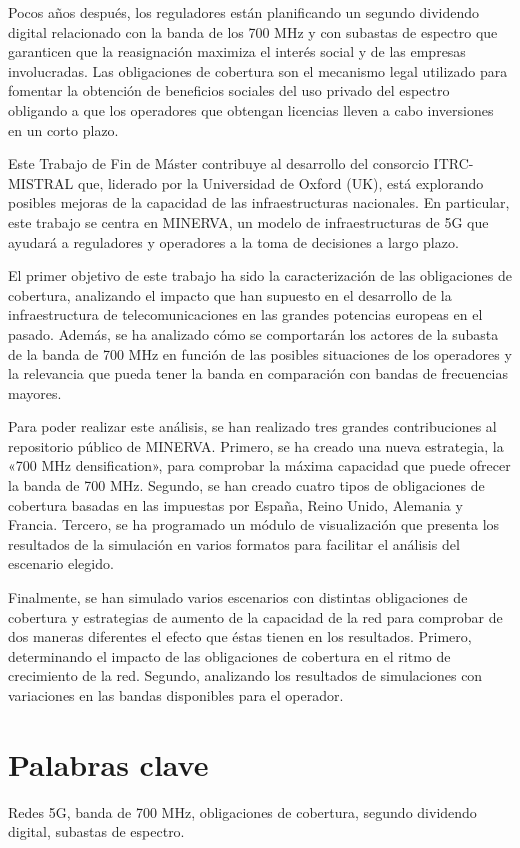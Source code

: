 Pocos años después, los reguladores están planificando un segundo dividendo digital relacionado con la banda de los 700 MHz y con subastas de espectro que garanticen que la reasignación maximiza el interés social y de las empresas involucradas. Las obligaciones de cobertura son el mecanismo legal utilizado para fomentar la obtención de beneficios sociales del uso privado del espectro obligando a que los operadores que obtengan licencias lleven a cabo inversiones en un corto plazo.\par

Este Trabajo de Fin de Máster contribuye al desarrollo del consorcio ITRC-MISTRAL que, liderado por la Universidad de Oxford (UK), está explorando posibles mejoras de la capacidad de las infraestructuras nacionales. En particular, este trabajo se centra en MINERVA, un modelo de infraestructuras de 5G que ayudará a reguladores y operadores a la toma de decisiones a largo plazo.\par

El primer objetivo de este trabajo ha sido la caracterización de las obligaciones de cobertura, analizando el impacto que han supuesto en el desarrollo de la infraestructura de telecomunicaciones en las grandes potencias europeas en el pasado. Además, se ha analizado cómo se comportarán los actores de la subasta de la banda de 700 MHz en función de las posibles situaciones de los operadores y la relevancia que pueda tener la banda en comparación con bandas de frecuencias mayores.\par

Para poder realizar este análisis, se han realizado tres grandes contribuciones al repositorio público de MINERVA. Primero, se ha creado una nueva estrategia, la «700 MHz densification», para comprobar la máxima capacidad que puede ofrecer la banda de 700 MHz. Segundo, se han creado cuatro tipos de obligaciones de cobertura basadas en las impuestas por España, Reino Unido, Alemania y Francia. Tercero, se ha programado un módulo de visualización que presenta los resultados de la simulación en varios formatos para facilitar el análisis del escenario elegido.\par

Finalmente, se han simulado varios escenarios con distintas obligaciones de cobertura y estrategias de aumento de la capacidad de la red para comprobar de dos maneras diferentes el efecto que éstas tienen en los resultados. Primero, determinando el impacto de las obligaciones de cobertura en el ritmo de crecimiento de la red. Segundo, analizando los resultados de simulaciones con variaciones en las bandas disponibles para el operador.\par


\section*{Palabras clave}
Redes 5G, banda de 700 MHz, obligaciones de cobertura, segundo dividendo digital, subastas de espectro.

